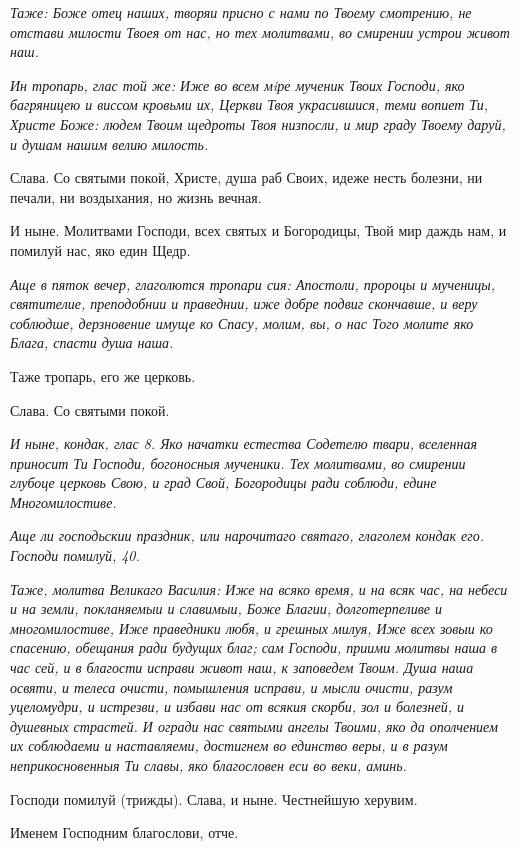 \itshape Таже:\normalfont{} Боже отец наших, творяи присно с нами по Твоему смотрению, не отстави милости Твоея от нас, но тех молитвами, во смирении устрои живот наш.


\itshape Ин тропарь, глас той же:\normalfont{} Иже во всем мiре мученик Твоих Господи, яко багряницею и виссом кровьми их, Церкви Твоя украсившися, теми вопиет Ти, Христе Боже: людем Твоим щедроты Твоя низпосли, и мир граду Твоему даруй, и душам нашим велию милость.

Слава. Со святыми покой, Христе, душа раб Своих, идеже несть болезни, ни печали, ни воздыхания, но жизнь вечная.

И ныне. Молитвами Господи, всех святых и Богородицы, Твой мир даждь нам, и помилуй нас, яко един Щедр.


\itshape Аще в пяток вечер, глаголются тропари сия:\normalfont{} Апостоли, пророцы и мученицы, святителие, преподобнии и праведнии, иже добре подвиг скончавше, и веру соблюдше, дерзновение имуще ко Спасу, молим, вы, о нас Того молите яко Блага, спасти душа наша.

Таже тропарь, его же церковь.

Слава. Со святыми покой.


\itshape И ныне, кондак, глас 8.\normalfont{} Яко начатки естества Содетелю твари, вселенная приносит Ти Господи, богоносныя мученики. Тех молитвами, во смирении глубоце церковь Свою, и град Свой, Богородицы ради соблюди, едине Многомилостиве.


\itshape Аще ли господьскии праздник, или нарочитаго святаго, глаголем кондак его.\normalfont{} Господи помилуй, 40.


\itshape Таже, молитва Великаго Василия:\normalfont{} Иже на всяко время, и на всяк час, на небеси и на земли, покланяемыи и славимыи, Боже Благии, долготерпеливе и многомилостиве, Иже праведники любя, и грешных милуя, Иже всех зовыи ко спасению, обещания ради будущих благ; сам Господи, приими молитвы наша в час сей, и в благости исправи живот наш,  к заповедем Твоим. Душа наша освяти, и телеса очисти,  помышления исправи, и мысли очисти, разум уцеломудри, и истрезви, и избави нас от всякия скорби, зол и болезней, и душевных страстей. И огради нас святыми ангелы Твоими, яко да ополчением их соблюдаеми и наставляеми, достигнем во единство веры, и в разум неприкосновенныя Ти славы, яко благословен еси во веки, аминь.

Господи помилуй (трижды). Слава, и ныне. Честнейшую херувим.

Именем Господним благослови, отче. 

